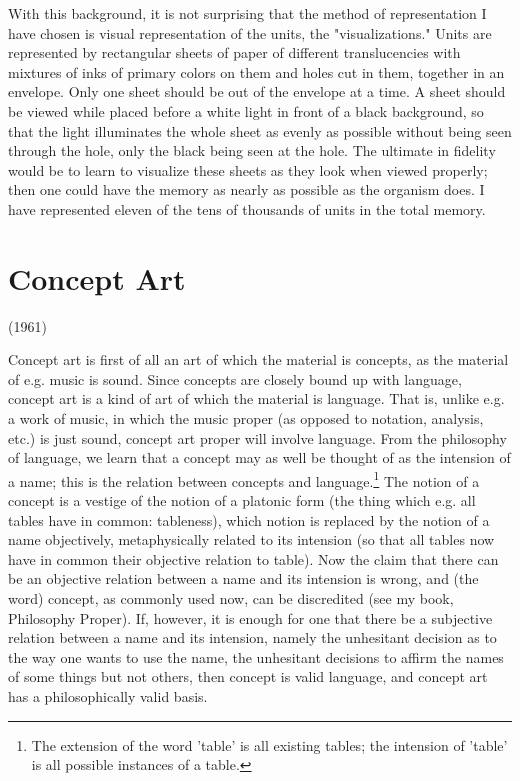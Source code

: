 \documentclass[10pt,twoside,draft]{memoir}
\begin{document}
{{With this background, it is not surprising that the method of 
representation I have chosen is visual representation of the units, the 
"visualizations." Units are represented by rectangular sheets of paper of 
different translucencies with mixtures of inks of primary colors on them and 
holes cut in them, together in an envelope. Only one sheet should be out of 
the envelope at a time. A sheet should be viewed while placed before a white 
light in front of a black background, so that the light illuminates the whole 
sheet as evenly as possible without being seen through the hole, only the 
black being seen at the hole. The ultimate in fidelity would be to learn to 
visualize these sheets as they look when viewed properly; then one could 
have the memory as nearly as possible as the organism does. I have 
represented eleven of the tens of thousands of units in the total memory. 


\chapter{Concept Art}
{ \raggedleft (1961) \par }


Concept art is first of all an art of which the material is concepts, as the 
material of e.g. music is sound. Since concepts are closely bound up with 
language, concept art is a kind of art of which the material is language. That 
is, unlike e.g. a work of music, in which the music proper (as opposed to 
notation, analysis, etc.) is just sound, concept art proper will involve 
language. From the philosophy of language, we learn that a concept may as 
well be thought of as the intension of a name; this is the relation between 
concepts and language.\footnote{The extension of the word 'table' is all 
existing tables; the intension of 'table' is all possible instances of a table.}
The notion of a concept is a vestige of the notion of 
a platonic form (the thing which e.g. all tables have in common: tableness), 
which notion is replaced by the notion of a name objectively, metaphysically 
related to its intension (so that all tables now have in common their 
objective relation to table). Now the claim that there can be an objective 
relation between a name and its intension is wrong, and (the word) concept, 
as commonly used now, can be discredited (see my book, Philosophy 
Proper). If, however, it is enough for one that there be a subjective relation 
between a name and its intension, namely the unhesitant decision as to the 
way one wants to use the name, the unhesitant decisions to affirm the names 
of some things but not others, then concept is valid language, and concept 
art has a philosophically valid basis. 

}}
\end{document}
